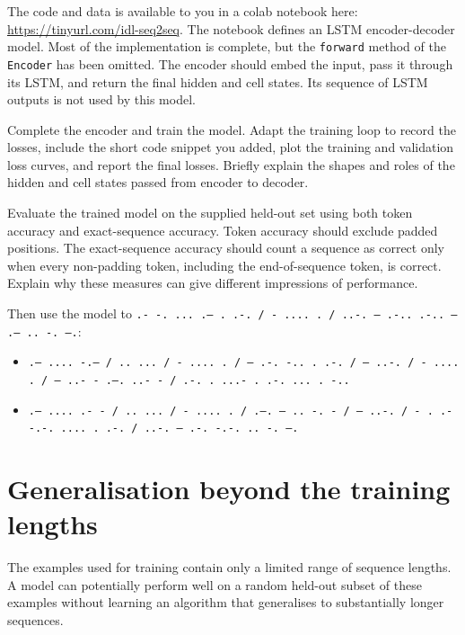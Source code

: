 \documentclass[a4paper]{article}
\begin{document}
The code and data is available to you in a colab notebook here: \url{https://tinyurl.com/idl-seq2seq}. The notebook defines an LSTM encoder-decoder model. Most of the implementation is complete, but the \texttt{forward} method of the \texttt{Encoder} has been omitted. The encoder should embed the input, pass it through its LSTM, and return the final hidden and cell states. Its sequence of LSTM outputs is not used by this model.

\begin{tcolorbox}[title=1.1 Complete and train the recurrent model (3 marks)]
Complete the encoder and train the model. Adapt the training loop to record the losses, include the short code snippet you added, plot the training and validation loss curves, and report the final losses. Briefly explain the shapes and roles of the hidden and cell states passed from encoder to decoder.
\end{tcolorbox}

\begin{tcolorbox}[parbox=false,title=1.2 Evaluate and use the model (2 marks)]
Evaluate the trained model on the supplied held-out set using both token accuracy and exact-sequence accuracy. Token accuracy should exclude padded positions. The exact-sequence accuracy should count a sequence as correct only when every non-padding token, including the end-of-sequence token, is correct. Explain why these measures can give different impressions of performance.

Then use the model to \texttt{.- -. ... .-- . .-. / - .... . / ..-. --- .-.. .-.. --- .-- .. -. --.}:
\begin{itemize}
    \item \texttt{.-- .... -.-- / .. ... / - .... . / --- .-. -.. . .-. / --- ..-. / - .... . / --- ..- - .--. ..- - / .-. . ...- . .-. ... . -..}
    \item \texttt{.-- .... .- - / .. ... / - .... . / .--. --- .. -. - / --- ..-. / - . .- -.-. .... . .-. / ..-. --- .-. -.-. .. -. --.}
\end{itemize}
\end{tcolorbox}

\section{Generalisation beyond the training lengths}

The examples used for training contain only a limited range of sequence lengths. A model can potentially perform well on a random held-out subset of these examples without learning an algorithm that generalises to substantially longer sequences.
\end{document}
